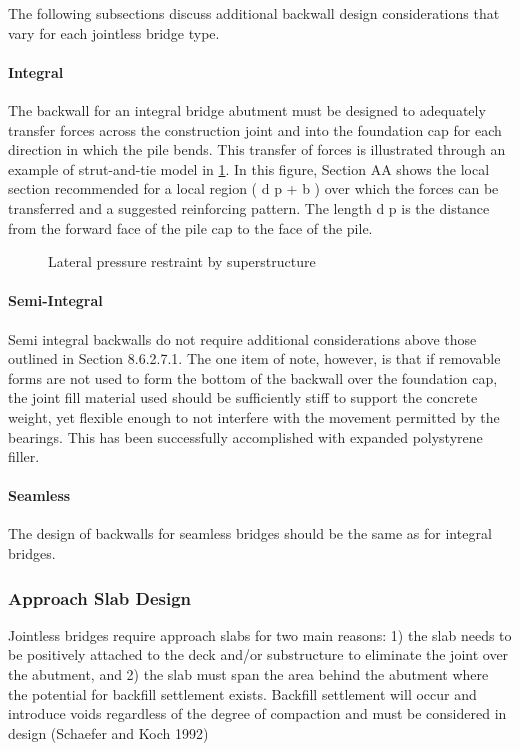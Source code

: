 The following subsections discuss additional backwall design considerations that vary for each jointless bridge type.

\paragraph{Integral}

The backwall for an integral bridge abutment must be designed to adequately transfer forces across the construction joint and into the foundation cap for each direction in which the pile bends. This transfer of forces is illustrated through an example of strut-and-tie model in \cref{fig:lateral-pressure}. In this figure, Section AA shows the local section recommended for a local region ( d p + b ) over which the forces can be transferred and a suggested reinforcing pattern. The length d p is the distance from the forward face of the pile cap to the face of the pile.

\begin{figure}
  \caption{Lateral pressure restraint by superstructure}
  \label{fig:lateral-pressure}
\end{figure}

\paragraph{Semi-Integral}

Semi integral backwalls do not require additional considerations above those outlined in Section 8.6.2.7.1. The one item of note, however, is that if removable forms are not used to form the bottom of the backwall over the foundation cap, the joint fill material used should be sufficiently stiff to support the concrete weight, yet flexible enough to not interfere with the movement permitted by the bearings. This has been successfully accomplished with expanded polystyrene filler.

\paragraph{Seamless}
The design of backwalls for seamless bridges should be the same as for integral bridges.


\subsubsection{Approach Slab Design}
Jointless bridges require approach slabs for two main reasons: 1) the slab needs to be positively attached to the
deck and/or substructure to eliminate the joint over the abutment, and 2) the slab must span the area behind the abutment where the potential for backfill settlement exists. Backfill settlement will occur and introduce voids
regardless of the degree of compaction and must be considered in design (Schaefer and Koch 1992)

